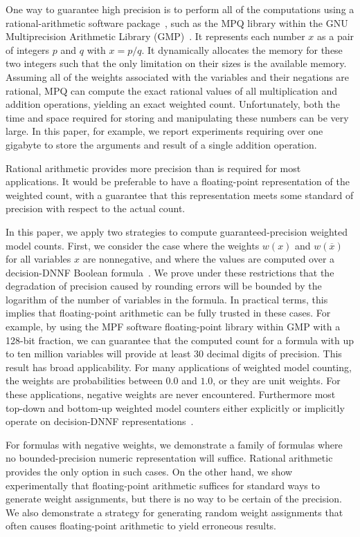 \documentclass[letterpaper,USenglish,cleveref, autoref, thm-restate]{lipics-v2021}
\newcommand{\obar}[1]{\overline{#1}}
\begin{document}
One way to guarantee high precision is to perform all of the
computations using a rational-arithmetic software package~\cite{knuth:rational:1981}, such as the
MPQ library within the GNU Multiprecision Arithmetic
Library (GMP)~\cite{granlund:gmp:2015}.  It represents each number $x$ as a
pair of integers $p$ and $q$ with $x = p/q$.  It dynamically allocates
the memory for these two integers such that the only limitation on
their sizes is the available memory.  Assuming all of the weights
associated with the variables and their negations are rational, MPQ
can compute the exact rational values of all multiplication and
addition operations, yielding an exact weighted count.  Unfortunately,
both the time and space required for storing and manipulating these numbers can be very
large.  In this paper, for example, we report experiments requiring over one gigabyte
to store the arguments and result of a single addition operation.

Rational arithmetic provides more precision than is required
for most applications.  It would be preferable to have a floating-point
representation of the weighted count, with a guarantee that this
representation meets some standard of precision with respect to the
actual count.

In this paper, we apply two strategies to compute 
guaranteed-precision weighted model counts.  First, we consider the
case where the weights $w(x)$ and $w(\obar{x})$ for all variables $x$ are nonnegative, and
where the values are computed over a decision-DNNF Boolean
formula~\cite{beame:uai:2013,huang:jair:2007,oztok:cp:2014}.
We prove under these restrictions
that the degradation of
precision caused by rounding errors will be bounded by the logarithm
of the number of variables in the formula.  In practical terms, this
implies that floating-point arithmetic can be fully trusted in these
cases.  For example, by using the MPF software floating-point library
within GMP with a 128-bit fraction, we can guarantee that the computed
count for a formula with up to ten million variables will provide at least
30 decimal digits of precision.
This result has broad applicability.
For many applications
of weighted model counting, the weights are probabilities between
$0.0$ and $1.0$, or they are unit weights.  For these applications,  negative weights are never encountered.
Furthermore most top-down and bottom-up weighted model
counters either explicitly or implicitly operate on decision-DNNF
representations~\cite{beame:uai:2013}.

For formulas with negative weights, we demonstrate a family of
formulas where no bounded-precision numeric representation will
suffice.  Rational arithmetic provides the only option in such cases.
On the other hand, we show experimentally that floating-point
arithmetic suffices for standard ways to generate weight assignments,
but there is no way to be certain of the precision.  We also
demonstrate a strategy for generating random weight assignments that
often causes floating-point arithmetic to yield erroneous results.
\end{document}
